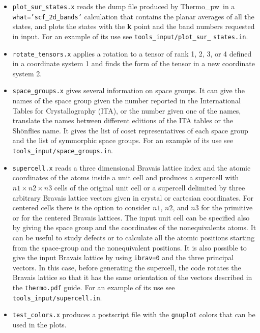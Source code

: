 \documentclass[12pt,a4paper,twoside]{report}
\def\thermo{{\sc Thermo\_pw}}
\begin{document}
\begin{itemize}
\item \texttt{plot\_sur\_states.x} reads the dump file produced
by \thermo\ in a \texttt{what='scf\_2d\_bands'} calculation that
contains the planar averages of all the states, and plots
the states with the {\bf k} point and the band numbers requested in input.
For an example of its use see \texttt{tools\_input/plot\_sur\_}
\texttt{states.in}.

\item \texttt{rotate\_tensors.x} applies a rotation to a tensor
of rank 1, 2, 3, or 4 defined in a coordinate system 1 and finds the form
of the tensor in a new coordinate system 2. 

\item \texttt{space\_groups.x} gives several information on space groups.
It can give the names of the space group given the number reported in
the International Tables for Crystallography (ITA), or
the number given one of the names, translate the names between different
editions of the ITA tables or the Sh\"onflies name. It gives the list 
of coset representatives of each space group and the list of symmorphic 
space groups.
For an example of its use see \texttt{tools\_input/space\_groups.in}.

\item \texttt{supercell.x} reads a three dimensional
Bravais lattice index and the atomic coordinates of the atoms inside a unit
cell and produces a supercell with $n1 \times n2 \times n3$ cells of 
the original
unit cell or a supercell delimited by three arbitrary Bravais lattice
vectors given in crystal or cartesian coordinates. For centered cells 
there is the option to consider $n1$, $n2$,
and $n3$ for the primitive or for the centered Bravais lattices.
The input unit cell can be specified also by giving the space group and
the coordinates of the nonequivalents atoms.
It can be useful to study defects or to calculate all the 
atomic positions starting from the space-group and the 
nonequivalent positions.
It is also possible to give the input Bravais lattice by using
\texttt{ibrav=0} and the three principal vectors. In this case,
before generating the supercell, the code rotates the Bravais
lattice so that it has the same orientation of the vectors described
in the \texttt{thermo.pdf} guide.
For an example of its use see \texttt{tools\_input/supercell.in}.

\item \texttt{test\_colors.x} produces a postscript file with the 
\texttt{gnuplot} colors that can be used in the plots.   


\end{itemize}
\end{document}
